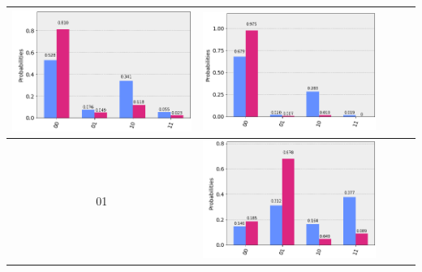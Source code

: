\documentclass[11pt]{article}
\begin{document}
\begin{table}[h!]
\begin{tabular}{| c | c | c | c | c | }
\begin{minipage}{.215\textwidth}
        \includegraphics[width=\linewidth]{img/one_qecc3_Z00.png}
      \end{minipage}
      &\begin{minipage}{.215\textwidth}
        \includegraphics[width=\linewidth]{img/one_qecc3_I00.png}
      \end{minipage}
      \\ \hline
      01 & 
      \begin{minipage}{.215\textwidth}
        \includegraphics[width=\linewidth]{img/one_qecc3_X01.png}

\end{minipage}
\end{tabular}
\end{table}
\end{document}
